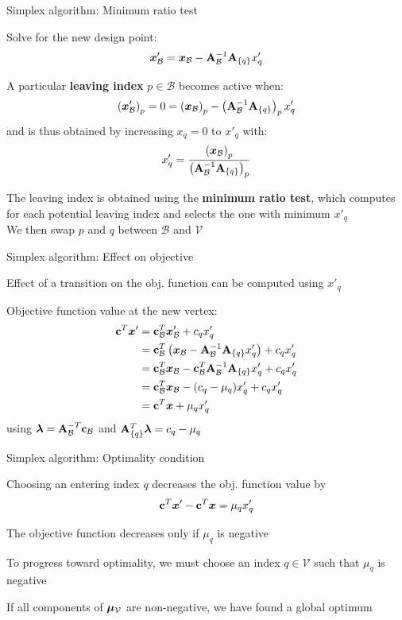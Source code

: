 \documentclass[11pt,compress,t,notes=noshow, xcolor=table]{beamer}
\begin{document}
\begin{framei}{Simplex algorithm: Minimum ratio test}
\item Solve for the new design point:
$$
\bm{x}'_{\mathcal{B}} = \bm{x}_{\mathcal{B}} - \mathbf{A}_{\mathcal{B}}^{-1} \mathbf{A}_{\{q\}} x'_q
$$
\item A particular \textbf{leaving index} $ p \in \mathcal{B} $ becomes active when:
$$
\left( \bm{x}'_{\mathcal{B}} \right)_p = 0 = \left( \bm{x}_{\mathcal{B}} \right)_p - \left( \mathbf{A}_{\mathcal{B}}^{-1} \mathbf{A}_{\{q\}} \right)_p x'_q
$$
and is thus obtained by increasing $ x_q = 0 $ to $ x'_q $ with:
$$x'_q = \frac{\left( \bm{x}_{\mathcal{B}} \right)_p}{\left( \mathbf{A}_{\mathcal{B}}^{-1} \mathbf{A}_{\{q\}} \right)_p}$$
\item The leaving index is obtained using the \textbf{minimum ratio test}, which computes for each potential leaving index and selects the one with minimum $ x'_q $\\
We then swap $ p $ and $ q $ between $ \mathcal{B} $ and $ \mathcal{V} $
\end{framei}


\begin{framei}{Simplex algorithm: Effect on objective}
\item Effect of a transition on the obj. function can be computed using $x'_q$
\item Objective function value at the new vertex:
\begin{align*}
\mathbf{c}^T \bm{x}' &= \mathbf{c}_{\mathcal{B}}^T \bm{x}'_{\mathcal{B}} + c_q x'_q \\
&= \mathbf{c}_{\mathcal{B}}^T \left( \bm{x}_{\mathcal{B}} - \mathbf{A}_{\mathcal{B}}^{-1} \mathbf{A}_{\{q\}} x'_q \right) + c_q x'_q \\
&= \mathbf{c}_{\mathcal{B}}^T \bm{x}_{\mathcal{B}} - \mathbf{c}_{\mathcal{B}}^T \mathbf{A}_{\mathcal{B}}^{-1} \mathbf{A}_{\{q\}} x'_q + c_q x'_q \\
&= \mathbf{c}_{\mathcal{B}}^T \bm{x}_{\mathcal{B}} - (c_q - \mu_q) x'_q + c_q x'_q \\
&= \mathbf{c}^T \bm{x} + \mu_q x'_q
\end{align*}
using $\bm{\lambda} = \mathbf{A}_{\mathcal{B}}^{-T} \mathbf{c}_{\mathcal{B}}$ and $\mathbf{A}_{\{q\}}^T\bm{\lambda}=c_q-\mu_q$
\end{framei}


\begin{framei}{Simplex algorithm: Optimality condition}
\item Choosing an entering index $q$ decreases the obj. function value by
$$
\mathbf{c}^T \bm{x}' - \mathbf{c}^T \bm{x} = \mu_q x'_q
$$
\item The objective function decreases only if $\mu_q$ is negative
\item To progress toward optimality, we must choose an index $q \in \mathcal{V}$ such that $\mu_q$ is negative
\item If all components of $\bm{\mu}_{\mathcal{V}}$ are non-negative, we have found a global optimum
\end{framei}
\end{document}
